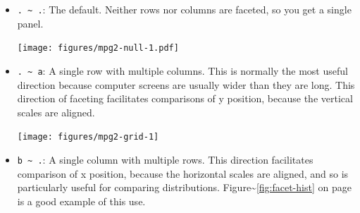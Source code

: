 \begin{itemize}
\item
  \texttt{. \textasciitilde{} .}: The default. Neither rows nor columns
  are faceted, so you get a single panel.

\begin{Shaded}
\begin{Highlighting}[]
\NormalTok{>}\StringTok{ } \StringTok{ }\NormalTok{()}
\end{Highlighting}
\end{Shaded}

  \texttt{[image: figures/mpg2-null-1.pdf]}
\item
  \texttt{. \textasciitilde{} a}: A single row with multiple columns.
  This is normally the most useful direction because computer screens
  are usually wider than they are long. This direction of faceting
  facilitates comparisons of y position, because the vertical scales are
  aligned.

\begin{Shaded}
\begin{Highlighting}[]
\NormalTok{>}\StringTok{ } \StringTok{ }\StringTok{ }
\end{Highlighting}
\end{Shaded}

  \texttt{[image: figures/mpg2-grid-1]}
\item
  \texttt{b \textasciitilde{} .}: A single column with multiple rows.
  This direction facilitates comparison of x position, because the
  horizontal scales are aligned, and so is particularly useful for
  comparing distributions. Figure\textasciitilde{}\ref{fig:facet-hist}
  on page \pageref{fig:facet-hist} is a good example of this use.
\end{itemize}

\begin{Shaded}
\begin{Highlighting}[]
\NormalTok{>}\StringTok{ } \NormalTok{, } \NormalTok{) +}
\NormalTok{+}\StringTok{   }\StringTok{ }
\end{Highlighting}
\end{Shaded}

